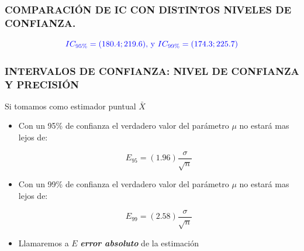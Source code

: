 \documentclass{beamer}
\begin{document}

\begin{frame}
\frametitle{COMPARACIÓN DE IC CON DISTINTOS NIVELES DE CONFIANZA. }

$$\color{blue}{IC_{95\%}=(180.4;219.6) \text{, y } IC_{99\%}=(174.3;225.7)}$$

\color{red}{Si aumento el nivel de confianza y el intervalo se hace mayor!!!}

\end{frame}


\begin{frame}
\frametitle{INTERVALOS DE CONFIANZA: NIVEL DE CONFIANZA Y PRECISIÓN}

Si tomamos como estimador puntual $\bar{X}$

\begin{itemize}
\item Con un 95\% de confianza el verdadero valor del parámetro $\mu$ no estará mas lejos de:

$$E_{95}=(1.96)\frac{\sigma }{\sqrt{n}}$$

\item Con un 99\% de confianza el verdadero valor del parámetro $\mu$ no estará mas lejos de:

$$E_{99}=(2.58)\frac{\sigma }{\sqrt{n}}$$
\item Llamaremos a $E$ \emph{\textbf{error absoluto}} de la estimación

\end{itemize}


\end{frame}

\end{document}
